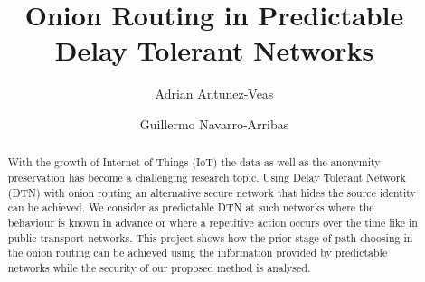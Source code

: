 \documentclass[runningheads,a4paper]{llncs}
\begin{document}


\title{Onion Routing in Predictable Delay Tolerant Networks}

\author{Adrian Antunez-Veas \and Guillermo Navarro-Arribas}

%
\iffalse
\author{Firstname Lastname\inst{1} \and Firstname Lastname\inst{2} }

\institute{
Insitute 1\\
\email{...}\and
Insitute 2\\
\email{...}
}
\fi
			
\maketitle

\begin{abstract}
With the growth of Internet of Things (IoT) the data as well as the anonymity preservation has become a challenging research topic. Using Delay Tolerant Network (DTN) with onion routing an alternative secure network that hides the source identity can be achieved. We consider as predictable DTN at such networks where the behaviour is known in advance or where a repetitive action occurs over the time like in public transport networks. This project shows how the prior stage of path choosing in the onion routing can be achieved using the information provided by predictable networks while the security of our proposed method is analysed.
\end{abstract}

\end{document}
